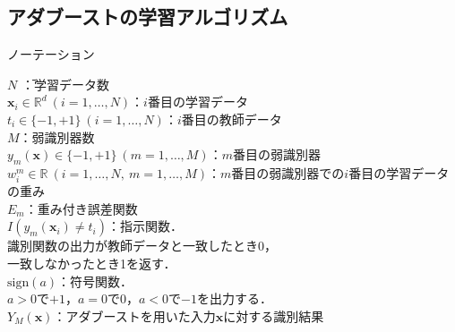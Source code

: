 \documentclass[dvipdfmx]{jreport}
\begin{document}
\subsection{アダブーストの学習アルゴリズム}
\label{アダブーストの学習アルゴリズム}
\begin{itembox}[l]{\large{ノーテーション}}
    \begin{tabbing}
        \hspace{15pt} \raisebox{0.5ex}{\tiny $\bullet$} $N$ \hspace{160pt}\=：学習データ数\\[0.5em]
        \hspace{15pt} \raisebox{0.5ex}{\tiny $\bullet$} $\bm{x}_i \in \mathbb{R}^d \ (i = 1, \dots, N)$\>：$i$番目の学習データ\\[0.5em]
        \hspace{15pt} \raisebox{0.5ex}{\tiny $\bullet$} $t_i \in \{-1, +1\} \ (i = 1, \dots, N)$\>：$i$番目の教師データ\\[0.5em]
        \hspace{15pt} \raisebox{0.5ex}{\tiny $\bullet$} $M$\>：弱識別器数\\[0.5em]
        \hspace{15pt} \raisebox{0.5ex}{\tiny $\bullet$} $y_m(\bm{x}) \in \{-1, +1\} \ (m = 1, \dots, M)$\>：$m$番目の弱識別器\\[0.5em]
        \hspace{15pt} \raisebox{0.5ex}{\tiny $\bullet$} $w^m_i \in \mathbb{R} \ (i = 1, \dots, N,\ m = 1, \dots, M)$\>：$m$番目の弱識別器での$i$番目の学習データの重み\\[0.5em]
        \hspace{15pt} \raisebox{0.5ex}{\tiny $\bullet$} $E_m$\>：重み付き誤差関数\\[0.5em]
        \hspace{15pt} \raisebox{0.5ex}{\tiny $\bullet$} $I(y_m(\bm{x}_i) \neq t_i)$\>：指示関数．\\[0.5em]\>\hspace{6.5pt}識別関数の出力が教師データと一致したとき0，\\[0.5em]\>\hspace{6.5pt}一致しなかったとき1を返す．\\[0.5em]
        \hspace{15pt} \raisebox{0.5ex}{\tiny $\bullet$} $\text{sign}(a)$\>：符号関数．\\[0.5em]\>\hspace{7pt}$a > 0$で$+1$，$a = 0$で$0$，$a < 0$で$-1$を出力する．\\[0.5em]
        \hspace{15pt} \raisebox{0.5ex}{\tiny $\bullet$} $Y_M(\bm{x})$\>：アダブーストを用いた入力$\bm{x}$に対する識別結果
    \end{tabbing}
\end{itembox}
\end{document}
